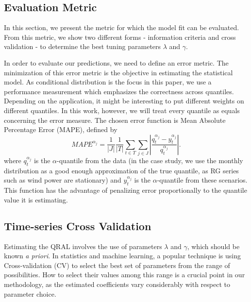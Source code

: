 \subsection{Evaluation Metric}

In this section, we present the metric for which the model fit can be evaluated. From this metric, we show two different forms - information criteria and cross validation - to determine the best tuning parameters $\lambda$ and $\gamma$.

In order to evaluate our predictions, we need to define an error metric. The minimization of this error metric is the objective in estimating the statistical model. 
As conditional distribution is the focus in this paper, we use a performance measurement which emphasizes the correctness across quantiles. Depending on the application, it might be interesting to put different weights on different quantiles. In this work, however, we will treat every quantile as equals concerning the error measure.
The chosen error function is Mean Absolute Percentage Error (MAPE), defined by
\begin{equation}
MAPE^{\alpha_j}= \frac{1}{|J|} \frac{1}{|T|}  \sum_{t \in T} \sum_{j \in J} \left| \frac{q_t^{\alpha_{j}}- y_t^{\alpha_{j}}}{q_t^{\alpha_{j}}}  \right|. 
\end{equation}
where $q_t^{\alpha_{j}}$ is the $\alpha$-quantile from the data (in the case study, we use the monthly distribution as a good enough approximation of the true quantile, as RG series such as wind power are stationary) and $y_t^{\alpha_j}$ is the $\alpha$-quantile from these scenarios.
This function has the advantage of penalizing error proportionally to the quantile value it is estimating. 


\subsection{Time-series Cross Validation} \label{sec:cv}

Estimating the QRAL involves the use of parameters $\lambda$ and $\gamma$, which should be known \textit{a priori}. In statistics and machine learning, a popular technique is using Cross-validation (CV) to select the best set of parameters from the range of possibilities. How to select their values among this range is a crucial point in our methodology, as the estimated coefficients vary considerably with respect to parameter choice.

